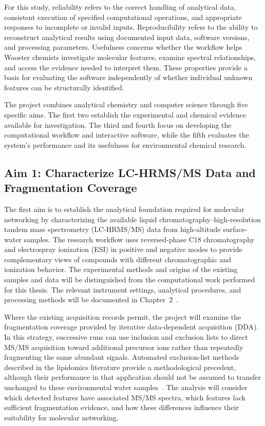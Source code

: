         For this study, reliability refers to the correct handling of analytical data, consistent execution of specified computational operations, and appropriate responses to incomplete or invalid inputs. Reproducibility refers to the ability to reconstruct analytical results using documented input data, software versions, and processing parameters. Usefulness concerns whether the workflow helps Wooster chemists investigate molecular features, examine spectral relationships, and access the evidence needed to interpret them. These properties provide a basis for evaluating the software independently of whether individual unknown features can be structurally identified.

        The project combines analytical chemistry and computer science through five specific aims. The first two establish the experimental and chemical evidence available for investigation. The third and fourth focus on developing the computational workflow and interactive software, while the fifth evaluates the system's performance and its usefulness for environmental chemical research.
       
    \subsection{Aim 1: Characterize LC-HRMS/MS Data and Fragmentation Coverage}\label{subsec:aim-one}

       The first aim is to establish the analytical foundation required for molecular networking by characterizing the available liquid chromatography--high-resolution tandem mass spectrometry (LC-HRMS/MS) data from high-altitude surface-water samples. The research workflow uses reversed-phase C18 chromatography and electrospray ionization (ESI) in positive and negative modes to provide complementary views of compounds with different chromatographic and ionization behavior. The experimental methods and origins of the existing samples and data will be distinguished from the computational work performed for this thesis. The relevant instrument settings, analytical procedures, and processing methods will be documented in Chapter~2~\cite{Wenkai,Gray2022,NinoSuastegui2025}.

        Where the existing acquisition records permit, the project will examine the fragmentation coverage provided by iterative data-dependent acquisition (DDA). In this strategy, successive runs can use inclusion and exclusion lists to direct MS/MS acquisition toward additional precursor ions rather than repeatedly fragmenting the same abundant signals. Automated exclusion-list methods described in the lipidomics literature provide a methodological precedent, although their performance in that application should not be assumed to transfer unchanged to these environmental water samples~\cite{Koelmel2017}. The analysis will consider which detected features have associated MS/MS spectra, which features lack sufficient fragmentation evidence, and how these differences influence their suitability for molecular networking.

